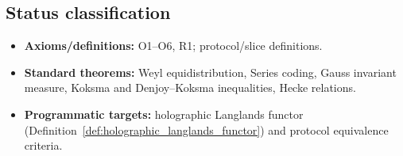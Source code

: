 \subsection{Status classification}

\begin{itemize}
\item \textbf{Axioms/definitions:} O1--O6, R1; protocol/slice definitions.
\item \textbf{Standard theorems:} Weyl equidistribution, Series coding, Gauss invariant measure, Koksma and Denjoy--Koksma inequalities, Hecke relations.
\item \textbf{Programmatic targets:} holographic Langlands functor (Definition~\ref{def:holographic_langlands_functor}) and protocol equivalence criteria.
\end{itemize}


